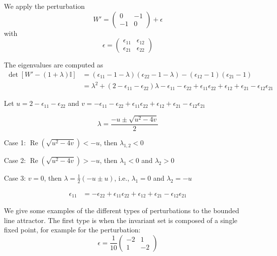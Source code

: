 \documentclass{article} %
\newcounter{ct}
\theoremstyle{definition}
\theoremstyle{remark}
\begin{document}
We apply the perturbation
\begin{equation}
W' = 
\begin{pmatrix}
0  &  -1 \\
-1  &  0
\end{pmatrix}
+ \epsilon
\end{equation}
with 
\begin{equation}
\epsilon = 
\begin{pmatrix}
\epsilon_{11}  &  \epsilon_{12} \\
\epsilon_{21}  &  \epsilon_{22}
\end{pmatrix}
\end{equation}

The eigenvalues are computed as
\begin{align*}
\det [W' -(1+\lambda)\mathbb{I}] &= (\epsilon_{11}-1-\lambda)(\epsilon_{22}-1-\lambda)-(\epsilon_{12}-1)(\epsilon_{21}-1)\\
&=\lambda^2 + (2-\epsilon_{11}-\epsilon_{22})\lambda -\epsilon_{11}-\epsilon_{22}+\epsilon_{11}\epsilon_{22} +\epsilon_{12} + \epsilon_{21} - \epsilon_{12}\epsilon_{21}
\end{align*}

Let 
$u=2-\epsilon_{11}-\epsilon_{22}$
and 
$v=-\epsilon_{11}-\epsilon_{22}+\epsilon_{11}\epsilon_{22} + \epsilon_{12} + \epsilon_{21} - \epsilon_{12}\epsilon_{21}$

\begin{equation}
\lambda = \frac{-u \pm \sqrt{u^2-4v}}{2}
\end{equation}



Case 1: $\operatorname{Re}(\sqrt{u^2-4v})<-u$, then 
$\lambda_{1,2}<0$


Case 2:  $\operatorname{Re}(\sqrt{u^2-4v})>-u$, then 
$\lambda_{1}<0$ and $\lambda_{2}>0$


Case 3: $v=0$, then 
$\lambda=\tfrac{1}{2}(-u\pm u)$, i.e.,
$\lambda_1=0$ and  $\lambda_2=-u$

\begin{align}
\epsilon_{11} &= -\epsilon_{22}+\epsilon_{11}\epsilon_{22} + \epsilon_{12} + \epsilon_{21} - \epsilon_{12}\epsilon_{21}
\end{align}



We give some examples of the different types of perturbations to the bounded line attractor.
The first type is when the invariant set is composed of a single fixed point, for example for the perturbation:
\begin{equation}
\epsilon = \frac{1}{10}
\begin{pmatrix}
-2  &  1 \\
 1   &  -2
\end{pmatrix}
\end{equation}
\end{document}
